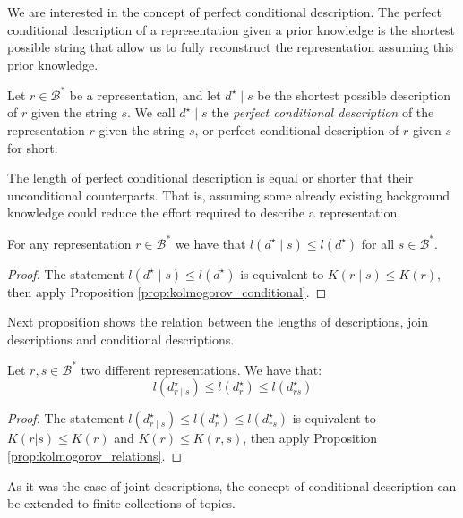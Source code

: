We are interested in the concept of perfect conditional description. The perfect conditional description of a representation given a prior knowledge is the shortest possible string that allow us to fully reconstruct the representation assuming this prior knowledge.

\begin{definition}
Let $r \in \mathcal{B}^\ast$ be a representation, and let $d^\star \mid s$ be the shortest possible description of $r$ given the string $s$. We call $d^\star \mid s$ the \emph{perfect conditional description} of the representation $r$ given the string $s$, or perfect conditional description of $r$ given $s$ for short.
\end{definition}

The length of perfect conditional description is equal or shorter that their unconditional counterparts. That is, assuming some already existing background knowledge could reduce the effort required to describe a representation.

\begin{proposition}
\label{prop:description_conditional_inequality}
For any representation $r \in \mathcal{B}^\ast$ we have that $l \left( d^\star \mid s \right) \leq l \left( d^\star \right)$ for all $s \in \mathcal{B}^\ast$.
\end{proposition}
\begin{proof}
The statement $l \left( d^\star \mid s \right) \leq l \left( d^\star \right)$ is equivalent to $K(r \mid s) \leq K(r)$, then apply Proposition \ref{prop:kolmogorov_conditional}.
\end{proof}

Next proposition shows the relation between the lengths of descriptions, join descriptions and conditional descriptions.

\begin{proposition}
\label{prop:description_conditional_joint}
Let $r, s \in \mathcal{B}^\ast$ two different representations. We have that:
\[
l \left( d^\star_{r \mid s} \right) \leq l \left( d^\star_r \right) \leq l \left( d^\star_{rs} \right)
\]
\end{proposition}
\begin{proof}
The statement $l \left( d^\star_{r \mid s} \right) \leq l \left( d^\star_r \right) \leq l \left( d^\star_{rs} \right)$ is equivalent to $K(r | s ) \leq K(r)$ and $K(r) \leq K(r, s)$, then apply Proposition \ref{prop:kolmogorov_relations}.
\end{proof}

As it was the case of joint descriptions, the concept of conditional description can be extended to finite collections of topics.

